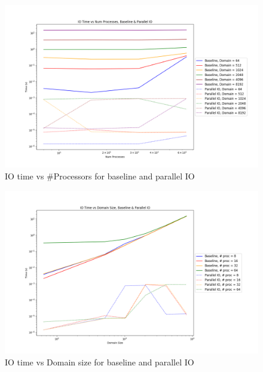 \begin{enumerate}
  \begin{figure}[p] %
    \begin{center}
      \includegraphics[width=.9\linewidth]{Figures/io/io_multdomain_haswell_io_baseline.png} %
      \caption{IO time vs \#Processors for baseline and parallel IO}
      \label{fig:par_io_io_vs_proc}
    \end{center}
 \end{figure}
 
 
 \begin{figure}[p] %
  \begin{center}
    \includegraphics[width=.9\linewidth]{Figures/io/io_multproc_haswell_io_baseline.png} %
    \caption{IO time vs Domain size for baseline and parallel IO}
    \label{fig:par_io_io_vs_domain}
  \end{center}
\end{figure}
 


\end{enumerate}
